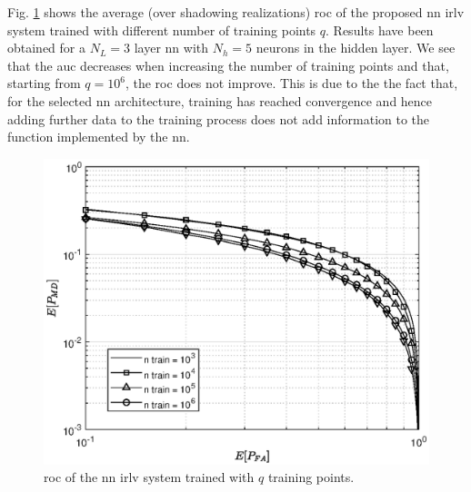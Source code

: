 \documentclass[conference,draftcls,onecolumn]{IEEEtran}
\begin{document}



Fig. \ref{fig:n_train} shows the average (over shadowing realizations) \ac{roc} of the proposed \ac{nn} \ac{irlv} system  trained with different number of training points $q$. Results have been obtained for a $N_L=3$ layer \ac{nn} with $N_h=5$ neurons in the hidden layer. We see that the \ac{auc} decreases when increasing the number of training points and that, starting from $q=10^6$, the \ac{roc} does not improve. This is due to the the fact that, for the selected \ac{nn} architecture, training has reached convergence and hence adding further data to the training process does not add information to the function implemented by the \ac{nn}. 

\begin{figure}[t]
    \centering
    \includegraphics[width=0.9\columnwidth]{mean_maps_2.eps}
    \caption{\ac{roc} of the \ac{nn} \ac{irlv} system trained with $q$ training points.}
    \label{fig:n_train}
\end{figure}
\end{document}
